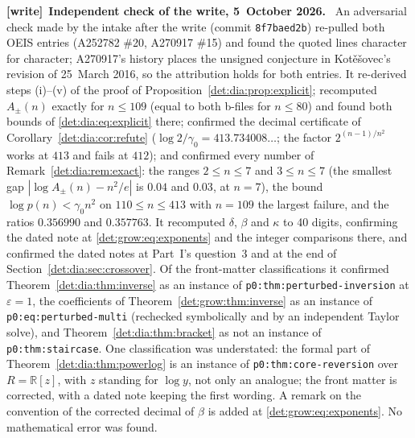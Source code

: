 \documentclass[11pt,letterpaper]{article}
\numberwithin{equation}{section}
\theoremstyle{definition}\newtheorem{definition}[theorem]{Definition}
\theoremstyle{remark}\newtheorem{remark}[theorem]{Remark}
\newcommand{\file}[1]{\nolinkurl{#1}}
\newenvironment{writenote}[1][]{\par\smallskip\begingroup\small
 \noindent\textbf{[write]}\if\relax\detokenize{#1}\relax\else~\textbf{#1.}\fi\ }%
 {\par\endgroup\smallskip}
\begin{document}
\begin{writenote}[Independent check of the write, 5~October 2026]
An adversarial check made by the intake after the write (commit \file{8f7baed2b}) re-pulled both OEIS entries (A252782 \#20, A270917 \#15) and found the quoted lines character for character; A270917's history places the unsigned conjecture in Kot\v{e}\v{s}ovec's revision of 25~March 2016, so the attribution holds for both entries. It re-derived steps (i)--(v) of the proof of Proposition~\ref{det:dia:prop:explicit}; recomputed $A_\pm(n)$ exactly for $n\le109$ (equal to both b-files for $n\le80$) and found both bounds of \eqref{det:dia:eq:explicit} there; confirmed the decimal certificate of Corollary~\ref{det:dia:cor:refute} ($\log2/\gamma_0=413.734008\ldots$; the factor $2^{(n-1)/n^2}$ works at $413$ and fails at $412$); and confirmed every number of Remark~\ref{det:dia:rem:exact}: the ranges $2\le n\le7$ and $3\le n\le7$ (the smallest gap $|\log A_\pm(n)-n^2/e|$ is $0.04$ and $0.03$, at $n=7$), the bound $\log p(n)<\gamma_0n^2$ on $110\le n\le413$ with $n=109$ the largest failure, and the ratios $0.356990$ and $0.357763$. It recomputed $\delta$, $\beta$ and $\kappa$ to 40 digits, confirming the dated note at \eqref{det:grow:eq:exponents} and the integer comparisons there, and confirmed the dated notes at Part~I's question~3 and at the end of Section~\ref{det:dia:sec:crossover}. Of the front-matter classifications it confirmed Theorem~\ref{det:dia:thm:inverse} as an instance of \file{p0:thm:perturbed-inversion} at $\varepsilon=1$, the coefficients of Theorem~\ref{det:grow:thm:inverse} as an instance of \file{p0:eq:perturbed-multi} (rechecked symbolically and by an independent Taylor solve), and Theorem~\ref{det:dia:thm:bracket} as not an instance of \file{p0:thm:staircase}. One classification was understated: the formal part of Theorem~\ref{det:dia:thm:powerlog} is an instance of \file{p0:thm:core-reversion} over $R=\mathbb R[z]$, with $z$ standing for $\log y$, not only an analogue; the front matter is corrected, with a dated note keeping the first wording. A remark on the convention of the corrected decimal of $\beta$ is added at \eqref{det:grow:eq:exponents}. No mathematical error was found.
\end{writenote}
\end{document}
